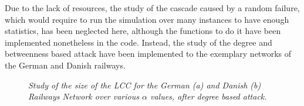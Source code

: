 Due to the lack of resources, the study of the cascade caused by a random failure, which would require to run the simulation over many instances to have enough statistics, has been neglected here, although the functions to do it have been implemented nonetheless in the code.
Instead, the study of the degree and betweenness based attack have been implemented to the exemplary networks of the German and Danish railways.






\begin{figure}[h!t]
\centering


\caption{\textit{\small{Study of the size of the LCC for the German (a) and Danish (b) Railways Network over various $\alpha$ values, after degree based attack.}}}
\label{fig:deg}
\end{figure}






